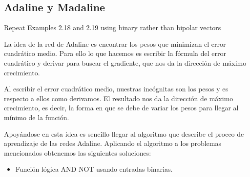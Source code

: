 \subsection{Adaline y Madaline}
\begin{problem}[16]
Repeat Examples 2.18 and 2.19 using binary rather than bipolar vectors
\solution

La idea de la red de Adaline es encontrar los pesos que minimizan el error cuadrático medio. Para ello lo que hacemos es escribir la fórmula del error cuadrático y derivar para buscar el gradiente, que nos da la dirección de máximo crecimiento.

Al escribir el error cuadrático medio, nuestras incógnitas son los pesos y es respecto a ellos como derivamos. El resultado nos da la dirección de máximo crecimiento, es decir, la forma en que se debe de variar los pesos para llegar al mínimo de la función.

Apoyándose en esta idea es sencillo llegar al algoritmo que describe el proceo de aprendizaje de las redes Adaline. Aplicando el algoritmo a los problemas mencionados obtenemos las siguientes soluciones:

\begin{itemize}
\item Función lógica AND NOT usando entradas binarias.



\end{itemize}
\end{problem}
